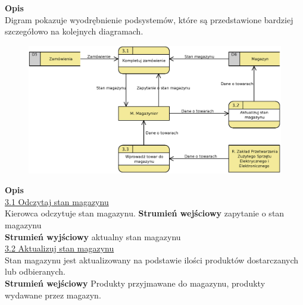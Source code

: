 \linespread{1.6}

\textbf{Opis}\\
Digram pokazuje wyodrębnienie podsystemów, które są przedstawione bardziej szczegółowo na kolejnych diagramach.


\begin{figure}[H]
	\centering
	\includegraphics[width=\textwidth]{img/DFD/2-level-magazyn.eps}
\end{figure}

\textbf{Opis} \\
\underline{3.1 Odczytaj stan magazynu}\\
Kierowca odczytuje stan magazynu.
\textbf{Strumień wejściowy} zapytanie o stan magazynu\\
\textbf{Strumień wyjściowy} aktualny stan magazynu\\

\underline{3.2 Aktualizuj stan magazynu}\\ 
Stan magazynu jest aktualizowany na podstawie ilości produktów dostarczanych lub odbieranych.\\	
\textbf{Strumień wejściowy} Produkty przyjmawane do magazynu, produkty wydawane przez magazyn.